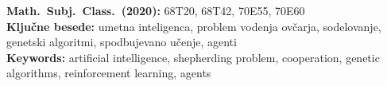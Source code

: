 \documentclass[12pt,a4paper,twoside]{article}
\newcommand{\kljucnebesede}{umetna inteligenca\sep problem vodenja ovčarja\sep sodelovanje\sep genetski algoritmi\sep spodbujevano učenje\sep agenti}
\newcommand{\keywords}{artificial intelligence\sep shepherding problem\sep cooperation\sep genetic algorithms\sep reinforcement learning\sep agents}
\newcommand{\sep}{, }
\newcommand{\literatura}{../literatura}
\theoremstyle{definition}
\theoremstyle{plain}
\numberwithin{equation}{section}
\begin{document}
\vfill\noindent
\textbf{Math.~Subj.~Class.~(2020):} 68T20, 68T42, 70E55, 70E60 \\[1mm]
\textbf{Ključne besede:} \kljucnebesede \\[1mm]
\textbf{Keywords:} \keywords

\cleardoublepage
\setcounter{page}{1}
\setlength{\parskip}{0.8em}












\cleardoublepage
{}
{}


\cleardoublepage
{}
{}
\printindex
\end{document}
